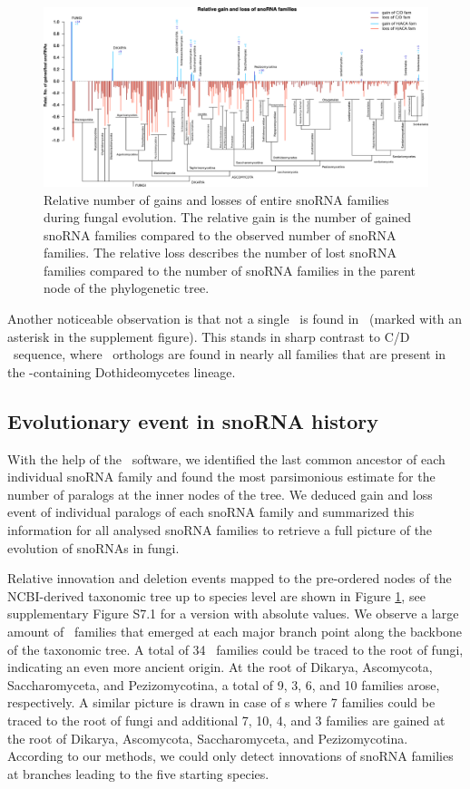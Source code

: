 \begin{figure}
  \centering
  \includegraphics[width=\textwidth]{pics/fungi_relative_gain_loss.eps}
  \caption{Relative number of gains and losses of entire snoRNA
    families during fungal evolution. The relative gain is the number
    of gained snoRNA families compared to the observed number of
    snoRNA families. The relative loss describes the number of lost
    snoRNA families compared to the number of snoRNA families in the
    parent node of the phylogenetic tree.}
\label{fig:relative_innovation_deletion_event}
\end{figure}

Another noticeable observation is that not a single \haca\ is found in
\Ptt\ (marked with an asterisk in the supplement figure). This stands
in sharp contrast to C/D \sno\ sequence, where \ptt\ orthologs are
found in nearly all families that are present in the \ptt-containing
Dothideomycetes lineage.

\subsection{Evolutionary event in snoRNA history}

With the help of the \epope\ software, we identified the last common
ancestor of each individual snoRNA family and found the most
parsimonious estimate for the number of paralogs at the inner nodes of
the tree.  We deduced gain and loss event of individual paralogs of
each snoRNA family and summarized this information for all analysed
snoRNA families to retrieve a full picture of the evolution of snoRNAs
in fungi.

Relative innovation and deletion events mapped to the pre-ordered
nodes of the NCBI-derived taxonomic tree up to species level are shown
in Figure \ref{fig:relative_innovation_deletion_event}, see
supplementary Figure S7.1 for a version with absolute values.  We
observe a large amount of \sno\ families that emerged at each major
branch point along the backbone of the taxonomic tree. A total of 34
\cd\ families could be traced to the root of fungi, indicating an even
more ancient origin. At the root of Dikarya, Ascomycota,
Saccharomyceta, and Pezizomycotina, a total of 9, 3, 6, and 10
families arose, respectively. A similar picture is drawn in case of
\haca s where 7 families could be traced to the root of fungi and
additional 7, 10, 4, and 3 families are gained at the root of Dikarya,
Ascomycota, Saccharomyceta, and Pezizomycotina.  According to our
methods, we could only detect innovations of snoRNA families at
branches leading to the five starting species.

